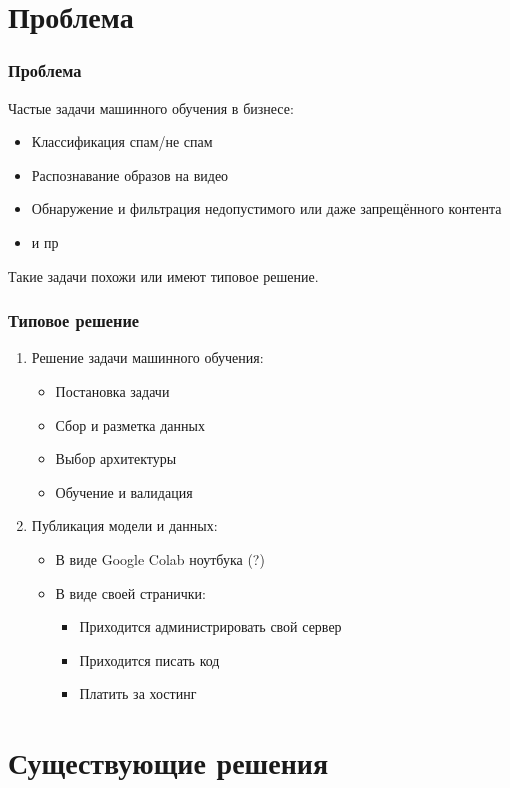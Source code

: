 \section{Проблема}

\begin{frame}
\frametitle{Проблема}
Частые задачи машинного обучения в бизнесе:
\begin{itemize}
    \item Классификация спам/не спам
    \item Распознавание образов на видео
    \item Обнаружение и фильтрация недопустимого или даже запрещённого контента
    \item и пр
\end{itemize}

\bigskip
\pause

\alert{Такие задачи похожи или имеют типовое решение.}
\end{frame}

\begin{frame}
\frametitle{Типовое решение}
\begin{enumerate}
    \item<1-> Решение задачи машинного обучения:
    \begin{itemize}
        \item Постановка задачи
        \item Сбор и разметка данных
        \item Выбор архитектуры
        \item Обучение и валидация
    \end{itemize}
    \item<2-> Публикация модели и данных:
    \begin{itemize}
        \item В виде Google Colab ноутбука (?)
        \item В виде своей странички:
        \begin{itemize}
            \item Приходится администрировать свой сервер
            \item Приходится писать код
            \item Платить за хостинг
        \end{itemize}
    \end{itemize}
\end{enumerate}
\end{frame}

\section{Существующие решения}

